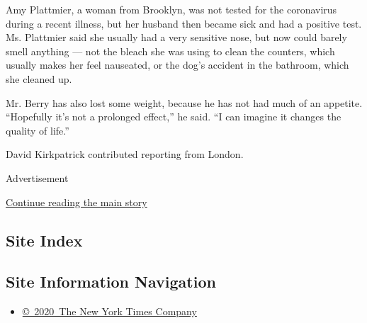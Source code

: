 Amy Plattmier, a woman from Brooklyn, was not tested for the coronavirus
during a recent illness, but her husband then became sick and had a
positive test. Ms. Plattmier said she usually had a very sensitive nose,
but now could barely smell anything --- not the bleach she was using to
clean the counters, which usually makes her feel nauseated, or the dog's
accident in the bathroom, which she cleaned up.

Mr. Berry has also lost some weight, because he has not had much of an
appetite. ``Hopefully it's not a prolonged effect,'' he said. ``I can
imagine it changes the quality of life.''

David Kirkpatrick contributed reporting from London.

Advertisement

\protect\hyperlink{after-bottom}{Continue reading the main story}

\hypertarget{site-index}{%
\subsection{Site Index}\label{site-index}}

\hypertarget{site-information-navigation}{%
\subsection{Site Information
Navigation}\label{site-information-navigation}}

\begin{itemize}
\tightlist
\item
  \href{https://help.nytimes3xbfgragh.onion/hc/en-us/articles/115014792127-Copyright-notice}{©~2020~The
  New York Times Company}
\end{itemize}

